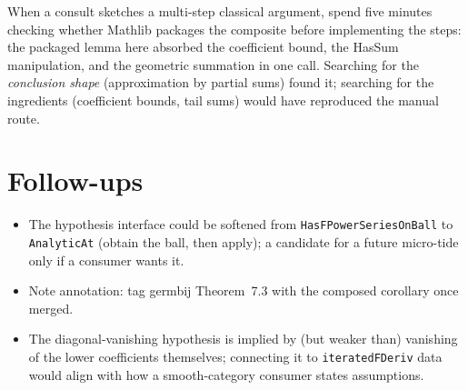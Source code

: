 \documentclass[11pt]{article}
\begin{document}
When a consult sketches a multi-step classical argument, spend five
minutes checking whether Mathlib packages the composite before
implementing the steps: the packaged lemma here absorbed the coefficient
bound, the HasSum manipulation, and the geometric summation in one call.
Searching for the \emph{conclusion shape} (approximation by partial sums)
found it; searching for the ingredients (coefficient bounds, tail sums)
would have reproduced the manual route.

\section{Follow-ups}

\begin{itemize}
\item The hypothesis interface could be softened from
\texttt{HasFPowerSeriesOnBall} to \texttt{AnalyticAt} (obtain the ball,
then apply); a candidate for a future micro-tide only if a consumer wants
it.
\item Note annotation: tag germbij Theorem~7.3 with the composed
corollary once merged.
\item The diagonal-vanishing hypothesis is implied by (but weaker than)
vanishing of the lower coefficients themselves; connecting it to
\texttt{iteratedFDeriv} data would align with how a smooth-category
consumer states assumptions.
\end{itemize}
\end{document}
